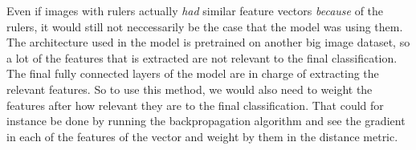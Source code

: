 Even if images with rulers actually \textit{had} similar feature vectors \textit{because} of the rulers,
it would still not neccessarily be the case that the model was using them.
The architecture used in the model is pretrained on another big image dataset,
so a lot of the features that is extracted are not relevant to the final classification. 
The final fully connected layers of the model are in charge of extracting the relevant features.
So to use this method, we would also need to weight the features after how relevant they are to
the final classification.
That could for instance be done by running the backpropagation algorithm and see the
gradient in each of the features of the vector and weight by them in the distance metric.
